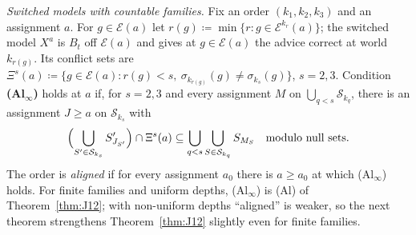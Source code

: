 \documentclass[11pt]{article}
\theoremstyle{definition}
\theoremstyle{remark}
\begin{document}
\emph{Switched models with countable families.} Fix an order $(k_1,k_2,k_3)$ and an assignment $a$. For $g\in\mathcal E(a)$ let $r(g)\coloneqq\min\{r:g\in\mathcal E^{k_r}(a)\}$; the switched model $X^a$ is $B_t$ off $\mathcal E(a)$ and gives at $g\in\mathcal E(a)$ the advice correct at world $k_{r(g)}$. Its conflict sets are $\Xi^s(a)\coloneqq\{g\in\mathcal E(a):r(g)<s,\ \sigma_{k_{r(g)}}(g)\ne\sigma_{k_s}(g)\}$, $s=2,3$. Condition \textbf{(Al$_\infty$)} holds at $a$ if, for $s=2,3$ and every assignment $M$ on $\bigcup_{q<s}\mathcal S_{k_q}$, there is an assignment $J\ge a$ on $\mathcal S_{k_s}$ with
\[
\Bigl(\bigcup_{S'\in\mathcal S_{k_s}}S'_{J_{S'}}\Bigr)\cap\Xi^s(a)\subseteq\bigcup_{q<s}\bigcup_{S\in\mathcal S_{k_q}}S_{M_S}\quad\text{modulo null sets.}
\]
The order is \emph{aligned} if for every assignment $a_0$ there is $a\ge a_0$ at which (Al$_\infty$) holds. For finite families and uniform depths, (Al$_\infty$) is (Al) of Theorem~\ref{thm:J12}; with non-uniform depths ``aligned'' is weaker, so the next theorem strengthens Theorem~\ref{thm:J12} slightly even for finite families.
\end{document}
